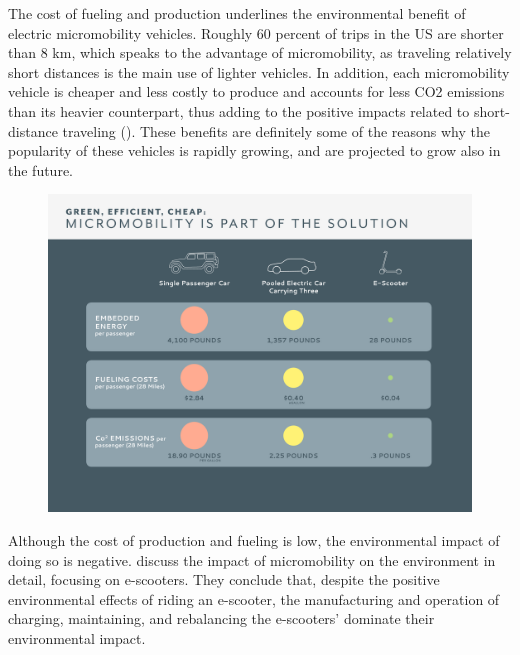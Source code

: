 The cost of fueling and production underlines the environmental benefit of electric micromobility vehicles. Roughly 60 percent of trips in the US are shorter than 8 km, which speaks to the advantage of micromobility, as traveling relatively short distances is the main use of lighter vehicles. In addition, each micromobility vehicle is cheaper and less costly to produce and accounts for less CO2 emissions than its heavier counterpart, thus adding to the positive impacts related to short-distance traveling (). These benefits are definitely some of the reasons why the popularity of these vehicles is rapidly growing, and are projected to grow also in the future. 
\\
\begin{figure}[H]
    \centering
    \includegraphics[width=0.8\columnwidth]{Images/carsscooters.png}
    \label{fig:cars_scooters}
\end{figure}

Although the cost of production and fueling is low, the environmental impact of doing so is negative.  \citet{hollingsworth_are_2019} discuss the impact of micromobility on the environment in detail, focusing on e-scooters. They conclude that, despite the positive environmental effects of riding an e-scooter, the manufacturing and operation of charging, maintaining, and rebalancing the e-scooters' dominate their environmental impact.


